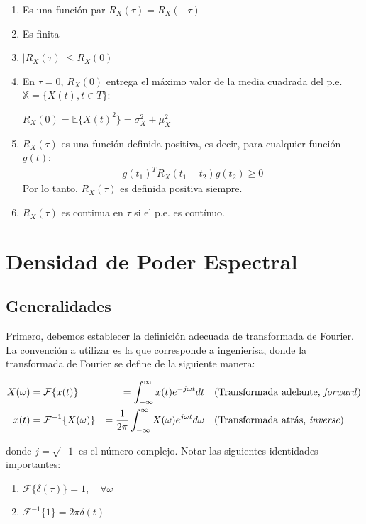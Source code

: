 \begin{enumerate}
    \item Es una función par $R_{X}(\tau) = R_{X}(-\tau)$
    \item Es finita
    \item $\left|R_{X} (\tau)\right| \leq R_{X} (0)$
    \item En $\tau=0$, $R_{X} (0)$ entrega el máximo valor de la media cuadrada del p.e. $\mathbb{X} = \{X(t), t \in T\}$:

    $R_{X}(0)=\mathbb{E}\{X(t)^2\}=\sigma^2_X + \mu_X^2$
    
    \item $R_{X}(\tau)$ es una función definida positiva, es decir, para cualquier función $g(t)$:
    \begin{align*}
        g(t_1)^T R_{X}(t_1-t_2)g(t_2)\geq 0
    \end{align*}
    Por lo tanto, $R_{X} (\tau)$ es definida positiva siempre.
    \item $R_{X} (\tau)$ es continua en $\tau$ si el p.e. es contínuo.
\end{enumerate}

\section{Densidad de Poder Espectral}

\subsection{Generalidades}

Primero, debemos establecer la definición adecuada de transformada de Fourier. La convención a utilizar es la que corresponde a ingenierísa, donde la transformada de Fourier se define de la siguiente manera:

\begin{align*}
    X(\omega) &= \mathcal{F}\{x(t)\} &=  \int_{-\infty}^{\infty} x(t) e^{-j \omega t} dt & & & \text{(Transformada adelante, \emph{forward})} \\
    x(t) &= \mathcal{F}^{-1}\{X(\omega)\} &= \frac{1}{2\pi} \int_{-\infty}^{\infty} X(\omega) e^{j \omega t} d\omega & & &\text{(Transformada atrás, \emph{inverse})}
\end{align*}

\noindent donde $j=\sqrt{-1}$ es el número complejo. Notar las siguientes identidades importantes:

\begin{enumerate}
    \item $\mathcal{F}\{\delta(\tau)\} = 1, \quad \forall\omega$
    \item $\mathcal{F}^{-1}\{1\} = 2 \pi \delta(t)$
\end{enumerate}


